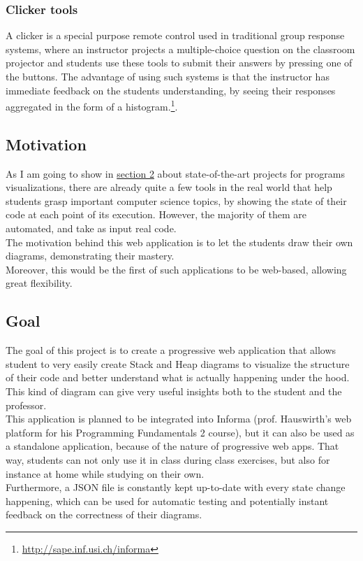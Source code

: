 \documentclass[]{usiinfbachelorproject}
\begin{document}
\vspace{\fill}
\pagebreak
 
\subsubsection{Clicker tools}
 
A clicker is a special purpose remote control used in traditional group response systems, where an instructor projects a multiple-choice question on the classroom projector and students use these tools to submit their answers by pressing one of the buttons. The advantage of using such systems is that the instructor has immediate feedback on the students understanding, by seeing their responses aggregated in the form of a histogram.\footnote{\url{http://sape.inf.usi.ch/informa}}.
 
\subsection{Motivation}

As I am going to show in \hyperref[state]{section 2} about state-of-the-art projects for programs visualizations, there are already quite a few tools in the real world that help students grasp important computer science topics, by showing the state of their code at each point of its execution. However, the majority of them are automated, and take as input real code.\\ 
The motivation behind this web application is to let the students draw their own diagrams, demonstrating their mastery.\\
Moreover, this would be the first of such applications to be web-based, allowing great flexibility.

\subsection{Goal} \label{goal}

The goal of this project is to create a progressive web application that allows student to very easily create Stack and Heap diagrams to visualize the structure of their code and better understand what is actually happening under the hood. This kind of diagram can give very useful insights both to the student and the professor.\\ This application is planned to be integrated into Informa (prof. Hauswirth's web platform for his Programming Fundamentals 2 course), but it can also be used as a standalone application, because of the nature of progressive web apps. That way, students can not only use it in class during class exercises, but also for instance at home while studying on their own.\\
Furthermore, a JSON file is constantly kept up-to-date with every state change happening, which can be used for automatic testing and potentially instant feedback on the correctness of their diagrams.
\end{document}
